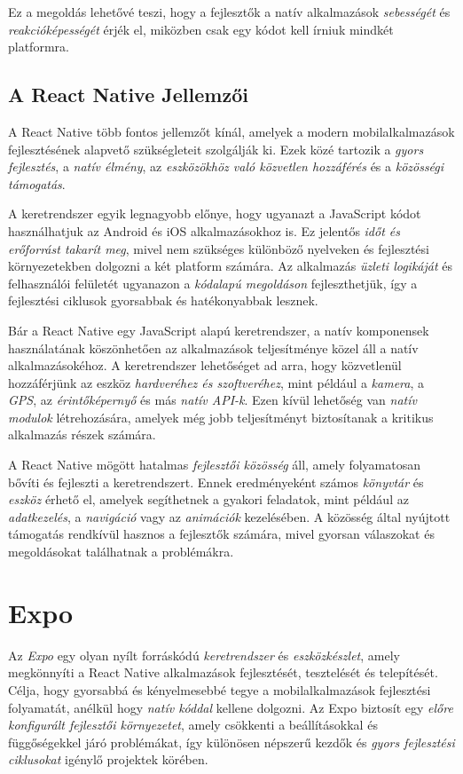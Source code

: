 \documentclass[
]{thesis-ekf}
\theoremstyle{definition}
\theoremstyle{remark}
\begin{document}
Ez a megoldás lehetővé teszi, hogy a fejlesztők a natív alkalmazások \emph{sebességét} és \emph{reakcióképességét} érjék el, miközben csak egy kódot kell írniuk mindkét platformra. \cite{mobilfejlesztes, reactNativeBook}

\subsection{A React Native Jellemzői}
A React Native több fontos jellemzőt kínál, amelyek a modern mobilalkalmazások fejlesztésének alapvető szükségleteit szolgálják ki. Ezek közé tartozik a \emph{gyors fejlesztés}, a \emph{natív élmény}, az \emph{eszközökhöz való közvetlen hozzáférés} és a \emph{közösségi támogatás}. \cite{mobilfejlesztes, reactNativeBook}

A keretrendszer egyik legnagyobb előnye, hogy ugyanazt a JavaScript kódot használhatjuk az Android és iOS alkalmazásokhoz is. Ez jelentős \emph{időt és erőforrást takarít meg}, mivel nem szükséges különböző nyelveken és fejlesztési környezetekben dolgozni a két platform számára. Az alkalmazás \emph{üzleti logikáját} és felhasználói felületét ugyanazon a \emph{kódalapú megoldáson} fejleszthetjük, így a fejlesztési ciklusok gyorsabbak és hatékonyabbak lesznek. \cite{mobilfejlesztes, reactNativeBook}

Bár a React Native egy JavaScript alapú keretrendszer, a natív komponensek használatának köszönhetően az alkalmazások teljesítménye közel áll a natív alkalmazásokéhoz. A keretrendszer lehetőséget ad arra, hogy közvetlenül hozzáférjünk az eszköz \emph{hardveréhez és szoftveréhez}, mint például a \emph{kamera}, a \emph{GPS}, az \emph{érintőképernyő} és más \emph{natív API-k}. Ezen kívül lehetőség van \emph{natív modulok} létrehozására, amelyek még jobb teljesítményt biztosítanak a kritikus alkalmazás részek számára. \cite{mobilfejlesztes, reactNativeBook}

A React Native mögött hatalmas \emph{fejlesztői közösség} áll, amely folyamatosan bővíti és fejleszti a keretrendszert. Ennek eredményeként számos \emph{könyvtár} és \emph{eszköz} érhető el, amelyek segíthetnek a gyakori feladatok, mint például az \emph{adatkezelés}, a \emph{navigáció} vagy az \emph{animációk} kezelésében. A közösség által nyújtott támogatás rendkívül hasznos a fejlesztők számára, mivel gyorsan válaszokat és megoldásokat találhatnak a problémákra. \cite{mobilfejlesztes, reactNativeBook}

\section{Expo}
Az \emph{Expo} egy olyan nyílt forráskódú \emph{keretrendszer} és \emph{eszközkészlet}, amely megkönnyíti a React Native alkalmazások fejlesztését, tesztelését és telepítését. Célja, hogy gyorsabbá és kényelmesebbé tegye a mobilalkalmazások fejlesztési folyamatát, anélkül hogy \emph{natív kóddal} kellene dolgozni. Az Expo biztosít egy \emph{előre konfigurált fejlesztői környezetet}, amely csökkenti a beállításokkal és függőségekkel járó problémákat, így különösen népszerű kezdők és \emph{gyors fejlesztési ciklusokat} igénylő projektek körében. \cite{expoOfficial}
\end{document}
